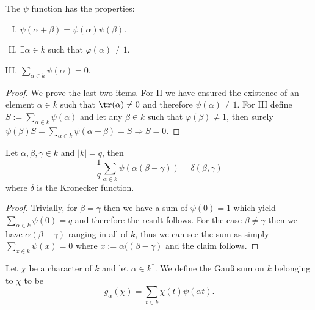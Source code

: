 \begin{proposition}
    The \(\psi\) function has the properties:
    \begin{enumerate}[I.]
        \item \(\psi(\alpha + \beta) = \psi(\alpha)\psi(\beta)\).
        \item \(\exists \alpha \in k\) such that \(\varphi(\alpha) \neq 1\).
        \item \(\sum_{\alpha \in k} \psi(\alpha) = 0\).
    \end{enumerate}
\end{proposition}

\begin{proof}
    We prove the last two items. For II we have ensured the existence of an
    element \(\alpha \in k\) such that \(\tr(\alpha) \neq  0\) and therefore
    \(\psi(\alpha) \neq  1\). For III define \(S := \sum_{\alpha \in
        k}\psi(\alpha)\) and let any \(\beta \in k\) such that \(\varphi(\beta) \neq
    1\), then surely \(\psi(\beta) S = \sum_{\alpha \in k} \psi(\alpha + \beta) =
    S \Rightarrow S = 0\).
\end{proof}

\begin{proposition}
    Let \(\alpha,\beta,\gamma \in k\) and \(|k| = q\), then
    \[
        \frac{1}{q} \sum_{\alpha \in k} \psi(\alpha(\beta - \gamma)) =
        \delta(\beta, \gamma)
    \]
    where \(\delta\) is the Kronecker function.
\end{proposition}

\begin{proof}
    Trivially, for \(\beta = \gamma\) then we have a sum of \(\psi(0) = 1\) which
    yield  \(\sum_{\alpha \in k} \psi(0) = q\) and therefore the result follows.
    For the case \(\beta\neq\gamma\) then we have \(\alpha(\beta - \gamma)\)
    ranging in all of \(k\), thus we can see the sum as simply  \(\sum_{x \in k}
    \psi(x) = 0\) where \(x := \alpha((\beta - \gamma)\) and the claim follows.
\end{proof}

\begin{definition}
    Let \(\chi\) be a character of \(k\) and let \(\alpha \in k^\ast\). We define
    the Gau{\ss} sum on \(k\) belonging to \(\chi\) to be
    \[
        g_\alpha(\chi) = \sum_{t \in k} \chi(t) \psi(\alpha t).
    \]
\end{definition}

